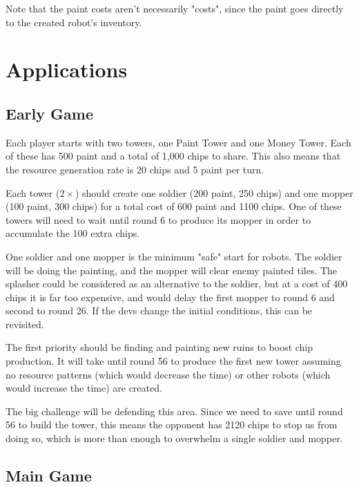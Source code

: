 \documentclass{article}
\begin{document}
  Note that the paint costs aren't necessarily "costs", since the paint goes directly to the created robot's inventory.

  \section*{Applications}

  \subsection*{Early Game}
  Each player starts with two towers, one Paint Tower and one Money Tower. Each of these has 500 paint and a total of 1,000 chips to share. This also means that the resource generation rate is 20 chips and 5 paint per turn.

  \medskip

  Each tower ($2 \times$) should create one soldier (200 paint, 250 chips) and one mopper (100 paint, 300 chips) for a total cost of 600 paint and 1100 chips. One of these towers will need to wait until round 6 to produce its mopper in order to accumulate the 100 extra chips.

  \medskip

  One soldier and one mopper is the minimum "safe" start for robots. The soldier will be doing the painting, and the mopper will clear enemy painted tiles. The splasher could be considered as an alternative to the soldier, but at a cost of 400 chips it is far too expensive, and would delay the first mopper to round 6 and second to round 26. If the devs change the initial conditions, this can be revisited.

  \medskip

  The first priority should be finding and painting new ruins to boost chip production. It will take until round 56 to produce the first new tower assuming no resource patterns (which would decrease the time) or other robots (which would increase the time) are created.

  \medskip

  The big challenge will be defending this area. Since we need to save until round 56 to build the tower, this means the opponent has 2120 chips to stop us from doing so, which is more than enough to overwhelm a single soldier and mopper.

  \subsection*{Main Game}
\end{document}
